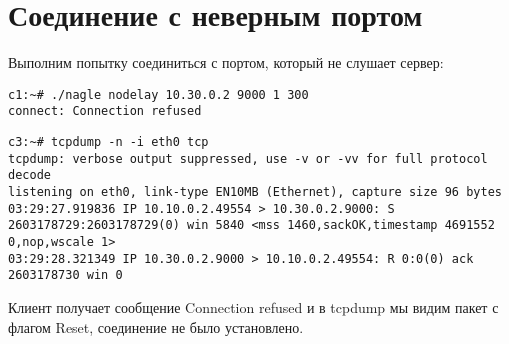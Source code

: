 \documentclass[a4paper,12pt]{article}
\begin{document}
\section{Соединение с неверным портом}

Выполним попытку соединиться с портом, который не слушает сервер:

\begin{Verbatim}
c1:~# ./nagle nodelay 10.30.0.2 9000 1 300
connect: Connection refused
\end{Verbatim}

\begin{Verbatim}
c3:~# tcpdump -n -i eth0 tcp
tcpdump: verbose output suppressed, use -v or -vv for full protocol decode
listening on eth0, link-type EN10MB (Ethernet), capture size 96 bytes
03:29:27.919836 IP 10.10.0.2.49554 > 10.30.0.2.9000: S 2603178729:2603178729(0) win 5840 <mss 1460,sackOK,timestamp 4691552 0,nop,wscale 1>
03:29:28.321349 IP 10.30.0.2.9000 > 10.10.0.2.49554: R 0:0(0) ack 2603178730 win 0
\end{Verbatim}

Клиент получает сообщение Connection refused и в tcpdump мы видим пакет с флагом Reset, соединение не было установлено. 
\end{document}
